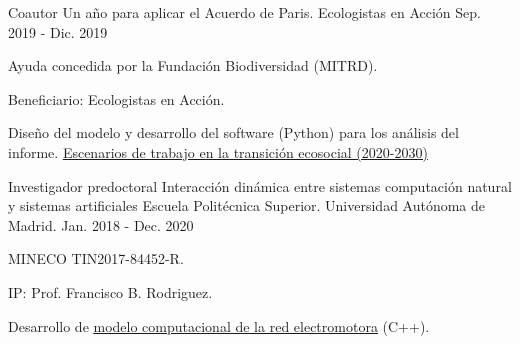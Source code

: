 \begin{cventries}
  \cventry %
    {Coautor} %
    {Un año para aplicar el Acuerdo de Paris.} %
    {Ecologistas en Acción} %
    {Sep. 2019 - Dic. 2019} %
    {
      \begin{cvitems} %
      	\item {Ayuda concedida por la Fundación Biodiversidad (MITRD).}
        \item {Beneficiario: Ecologistas en Acción.}
        \item {Diseño del modelo y desarrollo del software (Python) para los análisis del informe. \underline{\href{https://www.ecologistasenaccion.org/132893/informe-escenarios-de-trabajo-en-la-transicion-ecosocial-2020-2030/}{Escenarios de trabajo en la transición ecosocial (2020-2030)}} }
      \end{cvitems}
    }

  \cventry
    {Investigador predoctoral} %
    {Interacción dinámica entre sistemas computación natural y sistemas artificiales} %
    {Escuela Politécnica Superior. Universidad Autónoma de Madrid.} %
    {Jan. 2018 - Dec. 2020} %
    {
      \begin{cvitems} %
        \item {MINECO TIN2017-84452-R.}
        \item {IP: Prof. Francisco B. Rodriguez.}
        \item {Desarrollo de \underline{\href{https://github.com/GNB-UAM/electromotor-nmodel}{modelo computacional de la red electromotora}} (C++).}
      \end{cvitems}
    }
    



\end{cventries}
